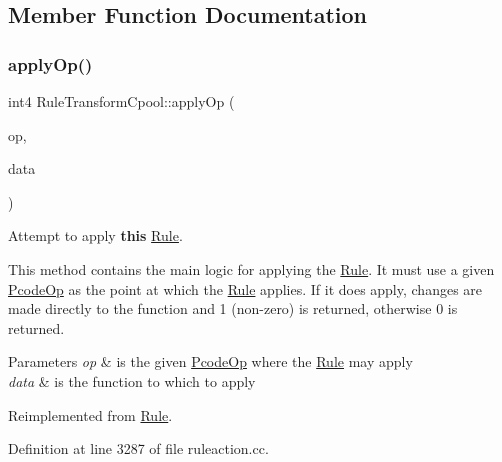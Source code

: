 \subsection{Member Function Documentation}
\mbox{\label{class_rule_transform_cpool_af499e077d284de28aa52a807b53152de}} 
\subsubsection{\texorpdfstring{applyOp()}{applyOp()}}
{\footnotesize\ttfamily int4 Rule\+Transform\+Cpool\+::apply\+Op (\begin{DoxyParamCaption}\item[{\mbox{\hyperlink{class_pcode_op}{Pcode\+Op}} $\ast$}]{op,  }\item[{\mbox{\hyperlink{class_funcdata}{Funcdata}} \&}]{data }\end{DoxyParamCaption})\hspace{0.3cm}{\ttfamily [virtual]}}



Attempt to apply {\bfseries{this}} \mbox{\hyperlink{class_rule}{Rule}}. 

This method contains the main logic for applying the \mbox{\hyperlink{class_rule}{Rule}}. It must use a given \mbox{\hyperlink{class_pcode_op}{Pcode\+Op}} as the point at which the \mbox{\hyperlink{class_rule}{Rule}} applies. If it does apply, changes are made directly to the function and 1 (non-\/zero) is returned, otherwise 0 is returned. 
\begin{DoxyParams}{Parameters}
{\em op} & is the given \mbox{\hyperlink{class_pcode_op}{Pcode\+Op}} where the \mbox{\hyperlink{class_rule}{Rule}} may apply \\
\hline
{\em data} & is the function to which to apply \\
\hline
\end{DoxyParams}


Reimplemented from \mbox{\hyperlink{class_rule_a4e3e61f066670175009f60fb9dc60848}{Rule}}.



Definition at line 3287 of file ruleaction.\+cc.

